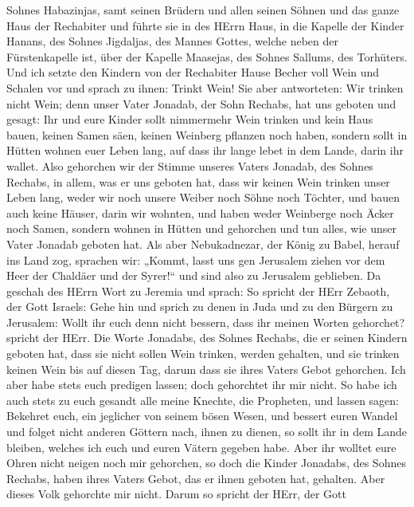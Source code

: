 Sohnes Habazinjas, samt seinen Brüdern und allen seinen Söhnen und das
ganze Haus der Rechabiter  und führte sie in des HErrn Haus,
in die Kapelle der Kinder Hanans, des Sohnes Jigdaljas, des Mannes
Gottes, welche neben der Fürstenkapelle ist, über der Kapelle Maasejas,
des Sohnes Sallums, des Torhüters.  Und ich setzte den
Kindern von der Rechabiter Hause Becher voll Wein und Schalen vor und
sprach zu ihnen: Trinkt Wein!  Sie aber antworteten: Wir
trinken nicht Wein; denn unser Vater Jonadab, der Sohn Rechabs, hat uns
geboten und gesagt: Ihr und eure Kinder sollt nimmermehr Wein trinken
 und kein Haus bauen, keinen Samen säen, keinen Weinberg
pflanzen noch haben, sondern sollt in Hütten wohnen euer Leben lang, auf
dass ihr lange lebet in dem Lande, darin ihr wallet.  Also
gehorchen wir der Stimme unseres Vaters Jonadab, des Sohnes Rechabs, in
allem, was er uns geboten hat, dass wir keinen Wein trinken unser Leben
lang, weder wir noch unsere Weiber noch Söhne noch Töchter, 
und bauen auch keine Häuser, darin wir wohnten, und haben weder
Weinberge noch Äcker noch Samen,  sondern wohnen in Hütten
und gehorchen und tun alles, wie unser Vater Jonadab geboten hat.
 Als aber Nebukadnezar, der König zu Babel, herauf ins Land
zog, sprachen wir: „Kommt, lasst uns gen Jerusalem ziehen vor dem Heer
der Chaldäer und der Syrer!{}`` und sind also zu Jerusalem geblieben.
 Da geschah des HErrn Wort zu Jeremia und sprach:
 So spricht der HErr Zebaoth, der Gott Israels: Gehe hin
und sprich zu denen in Juda und zu den Bürgern zu Jerusalem: Wollt ihr
euch denn nicht bessern, dass ihr meinen Worten gehorchet? spricht der
HErr.  Die Worte Jonadabs, des Sohnes Rechabs, die er
seinen Kindern geboten hat, dass sie nicht sollen Wein trinken, werden
gehalten, und sie trinken keinen Wein bis auf diesen Tag, darum dass sie
ihres Vaters Gebot gehorchen. Ich aber habe stets euch predigen lassen;
doch gehorchtet ihr mir nicht.  So habe ich auch stets zu
euch gesandt alle meine Knechte, die Propheten, und lassen sagen:
Bekehret euch, ein jeglicher von seinem bösen Wesen, und bessert euren
Wandel und folget nicht anderen Göttern nach, ihnen zu dienen, so sollt
ihr in dem Lande bleiben, welches ich euch und euren Vätern gegeben
habe. Aber ihr wolltet eure Ohren nicht neigen noch mir gehorchen,
 so doch die Kinder Jonadabs, des Sohnes Rechabs, haben
ihres Vaters Gebot, das er ihnen geboten hat, gehalten. Aber dieses Volk
gehorchte mir nicht.  Darum so spricht der HErr, der Gott

